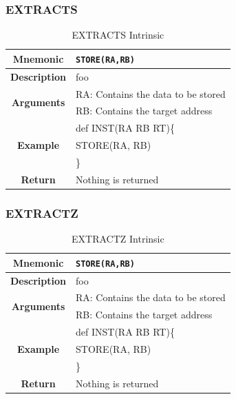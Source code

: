 \documentclass{article}
\begin{document}
\clearpage
\subsubsection{EXTRACTS}
\label{sec:EXTRACTS}

\begin{table}[h]
\begin{center}
\caption{EXTRACTS Intrinsic}
\vspace{0.125in}
\label{tab:EXTRACTSIntrinsic}
\begin{tabular}{|c|l|}
\hline
\textbf{Mnemonic} & \texttt{STORE(RA,RB)}\\
\hline
\textbf{Description} & foo\\
\hline
\multirow{2}{*}{\textbf{Arguments}} & RA: Contains the data to be stored\\
                          			     & RB: Contains the target address \\
\hline
\multirow{3}{*}{\textbf{Example}} & def INST(RA RB RT)\{\\
                          			  &   STORE(RA, RB)\\
                                                    & \}\\
\hline
\textbf{Return} & Nothing is returned\\                                                    
\hline
\end{tabular}
\end{center}
\end{table}

\clearpage
\subsubsection{EXTRACTZ}
\label{sec:EXTRACTZ}

\begin{table}[h]
\begin{center}
\caption{EXTRACTZ Intrinsic}
\vspace{0.125in}
\label{tab:EXTRACTZIntrinsic}
\begin{tabular}{|c|l|}
\hline
\textbf{Mnemonic} & \texttt{STORE(RA,RB)}\\
\hline
\textbf{Description} & foo\\
\hline
\multirow{2}{*}{\textbf{Arguments}} & RA: Contains the data to be stored\\
                          			     & RB: Contains the target address \\
\hline
\multirow{3}{*}{\textbf{Example}} & def INST(RA RB RT)\{\\
                          			  &   STORE(RA, RB)\\
                                                    & \}\\
\hline
\textbf{Return} & Nothing is returned\\                                                    
\hline
\end{tabular}
\end{center}
\end{table}
\end{document}
